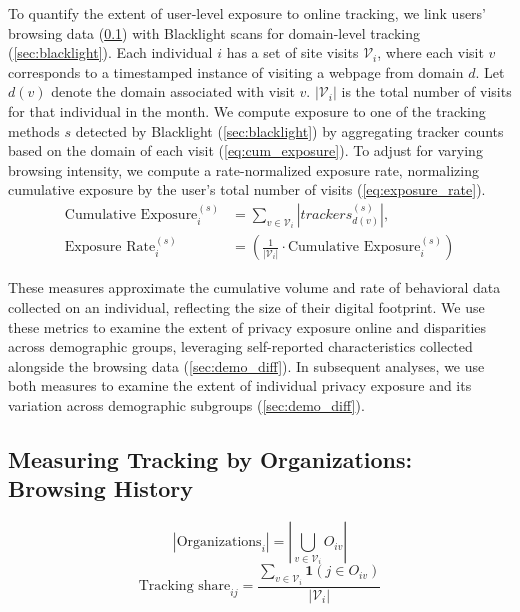 \documentclass[12pt, letterpaper]{article}
\begin{document}
To quantify the extent of user-level exposure to online tracking, we link users' browsing data (\cref{sec:browsing_history}) with Blacklight scans for domain-level tracking (\cref{sec:blacklight}). Each individual $i$ has a set of site visits $\mathcal{V}_i$, where each visit $v$ corresponds to a timestamped instance of visiting a webpage from domain $d$. Let $d(v)$ denote the domain associated with visit $v$. $\vert \mathcal{V}_i \vert$ is the total number of visits for that individual in the month. We compute exposure to one of the tracking methods $s$ detected by Blacklight (\cref{sec:blacklight}) by aggregating tracker counts based on the domain of each visit (\cref{eq:cum_exposure}). To adjust for varying browsing intensity, we compute a rate-normalized exposure rate, normalizing cumulative exposure by the user's total number of visits (\cref{eq:exposure_rate}). %
\begin{align}
\text{Cumulative Exposure}_i^{(s)} &= 
    \sum_{v \in \mathcal{V}_i}
    \left\vert 
        trackers^{(s)}_{d(v)} 
    \right\vert,
\label{eq:cum_exposure} \\
\text{Exposure Rate}_i^{(s)} &= 
    \left(
        \frac{1}{\vert \mathcal{V}_i \vert}
        \cdot
        \text{Cumulative Exposure}_i^{(s)}
    \right) 
\label{eq:exposure_rate}
\end{align}

These measures approximate the cumulative volume and rate of behavioral data collected on an individual, reflecting the size of their digital footprint.
We use these metrics to examine the extent of privacy exposure online and disparities across demographic groups, leveraging self-reported characteristics collected alongside the browsing data (\cref{sec:demo_diff}).
In subsequent analyses, we use both measures to examine the extent of individual privacy exposure and its variation across demographic subgroups (\cref{sec:demo_diff}).

\subsection{Measuring Tracking by Organizations: Browsing History}\label{sec:browsing_history}

\begin{equation}\label{eq:org_per_user}
\left| \text{Organizations}_i \right| = 
\left| 
\bigcup_{v \in \mathcal{V}_i} O_{iv} 
\right|
\end{equation}
\begin{equation}\label{eq:ind_org_share_visits}
\text{Tracking share}_{ij} = 
\frac{
    \sum_{v \in \mathcal{V}_i}
    \mathbf{1}
    (j \in O_{iv})
}
{
    \vert \mathcal{V}_i \vert
}
\end{equation}
\end{document}
